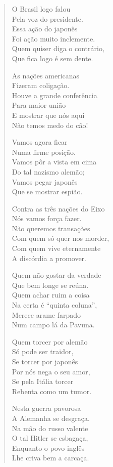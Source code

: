 \begin{verse}
O Brasil logo falou \\
Pela voz do presidente.\\
Essa ação do japonês\\
Foi ação muito inclemente.\\
Quem quiser diga o contrário,\\
Que fica logo é sem dente.

As nações americanas\\
Fizeram coligação.\\
Houve a grande conferência\\
Para maior união\\
E mostrar que nós aqui\\
Não temos medo do cão!
\pagebreak

Vamos agora ficar\\
Numa firme posição.\\
Vamos pôr a vista em cima\\
Do tal nazismo alemão;\\
Vamos pegar japonês\\
Que se mostrar espião.

Contra as três nações do Eixo\\
Nós vamos força fazer.\\
Não queremos transações\\
Com quem só quer nos morder,\\
Com quem vive eternamente\\
A discórdia a promover.

Quem não gostar da verdade\\
Que bem longe se reúna.\\
Quem achar ruim a coisa\\
Na certa é “quinta coluna”,\\
Merece arame farpado\\
Num campo lá da Pavuna.

Quem torcer por alemão\\
Só pode ser traidor,\\
Se torcer por japonês\\
Por nós nega o seu amor,\\
Se pela Itália torcer\\
Rebenta como um tumor.
\pagebreak

Nesta guerra pavorosa\\
A Alemanha se desgraça.\\
Na mão do russo valente\\
O tal Hitler se esbagaça,\\
Enquanto o povo inglês\\
Lhe criva bem a carcaça.


\end{verse}
